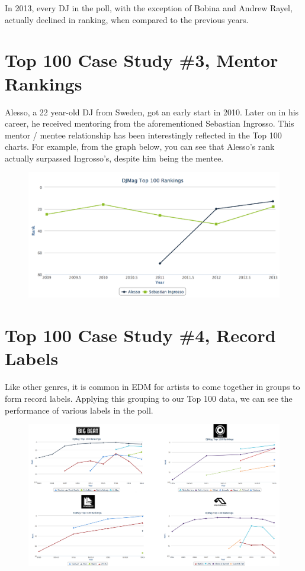 \documentclass[12pt]{dalcsthesis}
\begin{document}
In 2013, every DJ in the poll, with the exception of Bobina and Andrew Rayel, actually declined in ranking, when compared to the previous years.

\section{Top 100 Case Study \#3, Mentor Rankings}

Alesso, a 22 year-old DJ from Sweden, got an early start in 2010. Later on in his career, he received mentoring from the aforementioned Sebastian Ingrosso. This mentor / mentee relationship has been interestingly reflected in the Top 100 charts. For example, from the graph below, you can see that Alesso's rank actually surpassed Ingrosso's, despite him being the mentee.

\begin{figure}[h]
\includegraphics[scale=.65]{alesso_seb_graph}
\centering
\end{figure}

\section{Top 100 Case Study \#4, Record Labels}

Like other genres, it is common in EDM for artists to come together in groups to form record labels. Applying this grouping to our Top 100 data, we can see the performance of various labels in the poll. 

\begin{figure}[h]
\includegraphics[scale=.45]{label_graph}
\centering
\end{figure}
\end{document}
